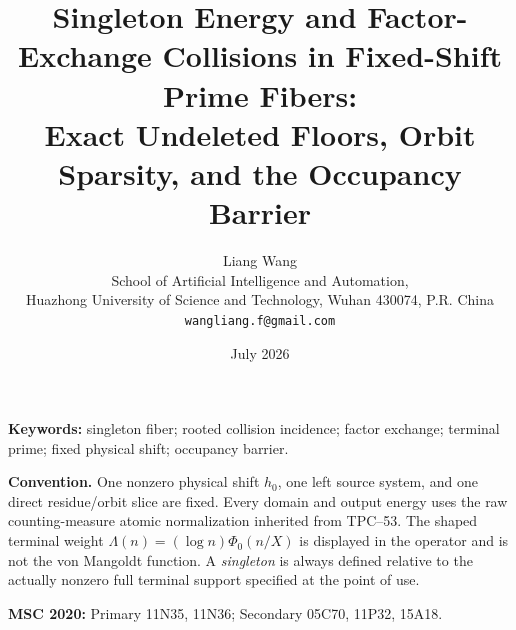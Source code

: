 \documentclass[11pt]{article}
\title{\bfseries Singleton Energy and Factor-Exchange Collisions in Fixed-Shift Prime Fibers:\\
Exact Undeleted Floors, Orbit Sparsity, and the Occupancy Barrier}
\author{Liang Wang\\
\small School of Artificial Intelligence and Automation,\\[-2pt]
\small Huazhong University of Science and Technology, Wuhan 430074, P.R. China\\
\small \texttt{wangliang.f@gmail.com}}
\date{July 2026}
\theoremstyle{definition}
\theoremstyle{remark}
\begin{document}
\maketitle



\noindent\textbf{Keywords:} singleton fiber; rooted collision incidence;
factor exchange; terminal prime; fixed physical shift; occupancy barrier.

\medskip
\noindent\textbf{Convention.}
One nonzero physical shift \(h_0\), one left source system, and one direct
residue/orbit slice are fixed.  Every domain and output energy uses the raw
counting-measure atomic normalization inherited from TPC--53.  The shaped
terminal weight \(\Lambda(n)=(\log n)\Phi_0(n/X)\) is displayed in the
operator and is not the von Mangoldt function.  A \emph{singleton} is
always defined relative to the actually nonzero full terminal support
specified at the point of use.

\medskip
\noindent\textbf{MSC 2020:} Primary 11N35, 11N36; Secondary 05C70,
11P32, 15A18.










\begingroup
\small
\raggedright
\setlength{\bibsep}{4pt plus 1pt minus 1pt}


\endgroup
\end{document}
